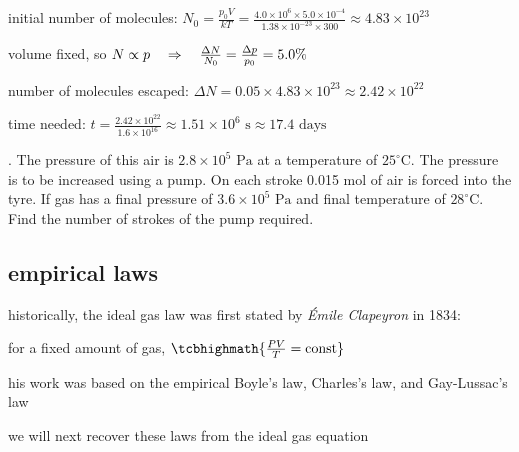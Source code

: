 \begin{soln} initial number of molecules: $N_0 = \frac{p_0V}{kT} = \frac{4.0\times10^6\times 5.0\times10^{-4}}{1.38\times10^{-23}\times300}\approx 4.83\times10^{23}$

\eqyskip

volume fixed, so $N \propto p \quad \Rightarrow \quad \frac{\Delta N}{N_0} = \frac{\Delta p}{p_0} = 5.0\%$

number of molecules escaped: $\Delta N = 0.05\times4.83\times10^{23} \approx 2.42 \times10^{22}$

time needed: $t = \frac{2.42 \times10^{22}}{1.6 \times 10^{16}} \approx 1.51 \times 10^6 \text{ s} \approx 17.4 \text{ days}$ \end{soln}

\newpage %


. The pressure of this air is $2.8\times10^5 \text{ Pa}$ at a temperature of $25^\circ$C. The pressure is to be increased using a pump. On each stroke 0.015 mol of air is forced into the tyre. If gas has a final pressure of $3.6\times10^5 \text{ Pa}$ and final temperature of $28^\circ$C. Find the number of strokes of the pump required.


\subsection{empirical laws}

historically, the ideal gas law was first stated by \emph{\'Emile Clapeyron} in 1834:

for a fixed amount of gas, $\tcbhighmath{\frac{PV}{T} = \text{const}}$

his work was based on the empirical Boyle's law, Charles's law, and Gay-Lussac's law

we will next recover these laws from the ideal gas equation

